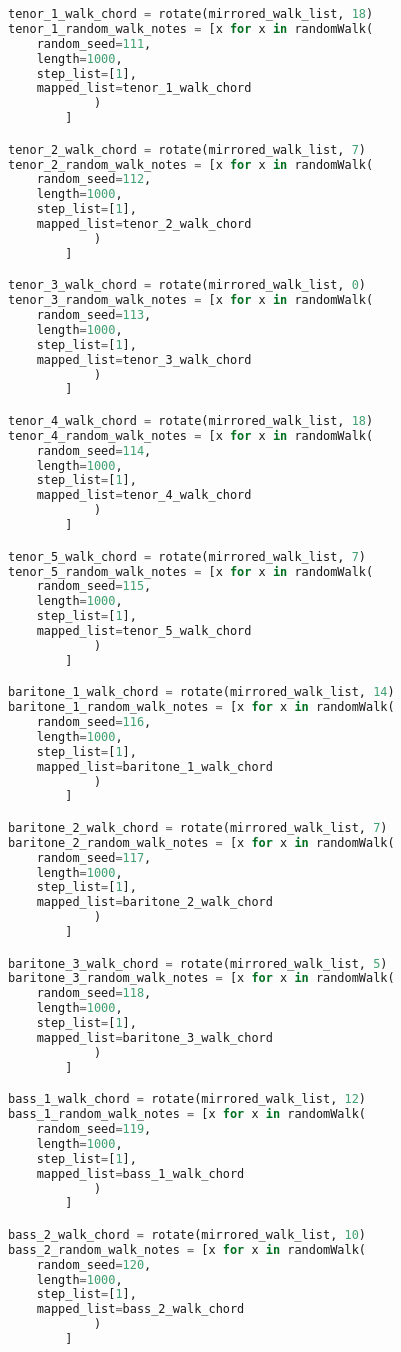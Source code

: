 \begin{lstlisting}[language=Python, caption=Invocation Source Code]
tenor_1_walk_chord = rotate(mirrored_walk_list, 18)
tenor_1_random_walk_notes = [x for x in randomWalk(
    random_seed=111,
    length=1000,
    step_list=[1],
    mapped_list=tenor_1_walk_chord
            )
        ]

tenor_2_walk_chord = rotate(mirrored_walk_list, 7)
tenor_2_random_walk_notes = [x for x in randomWalk(
    random_seed=112,
    length=1000,
    step_list=[1],
    mapped_list=tenor_2_walk_chord
            )
        ]

tenor_3_walk_chord = rotate(mirrored_walk_list, 0)
tenor_3_random_walk_notes = [x for x in randomWalk(
    random_seed=113,
    length=1000,
    step_list=[1],
    mapped_list=tenor_3_walk_chord
            )
        ]

tenor_4_walk_chord = rotate(mirrored_walk_list, 18)
tenor_4_random_walk_notes = [x for x in randomWalk(
    random_seed=114,
    length=1000,
    step_list=[1],
    mapped_list=tenor_4_walk_chord
            )
        ]

tenor_5_walk_chord = rotate(mirrored_walk_list, 7)
tenor_5_random_walk_notes = [x for x in randomWalk(
    random_seed=115,
    length=1000,
    step_list=[1],
    mapped_list=tenor_5_walk_chord
            )
        ]

baritone_1_walk_chord = rotate(mirrored_walk_list, 14)
baritone_1_random_walk_notes = [x for x in randomWalk(
    random_seed=116,
    length=1000,
    step_list=[1],
    mapped_list=baritone_1_walk_chord
            )
        ]

baritone_2_walk_chord = rotate(mirrored_walk_list, 7)
baritone_2_random_walk_notes = [x for x in randomWalk(
    random_seed=117,
    length=1000,
    step_list=[1],
    mapped_list=baritone_2_walk_chord
            )
        ]

baritone_3_walk_chord = rotate(mirrored_walk_list, 5)
baritone_3_random_walk_notes = [x for x in randomWalk(
    random_seed=118,
    length=1000,
    step_list=[1],
    mapped_list=baritone_3_walk_chord
            )
        ]

bass_1_walk_chord = rotate(mirrored_walk_list, 12)
bass_1_random_walk_notes = [x for x in randomWalk(
    random_seed=119,
    length=1000,
    step_list=[1],
    mapped_list=bass_1_walk_chord
            )
        ]

bass_2_walk_chord = rotate(mirrored_walk_list, 10)
bass_2_random_walk_notes = [x for x in randomWalk(
    random_seed=120,
    length=1000,
    step_list=[1],
    mapped_list=bass_2_walk_chord
            )
        ]


\end{lstlisting}
